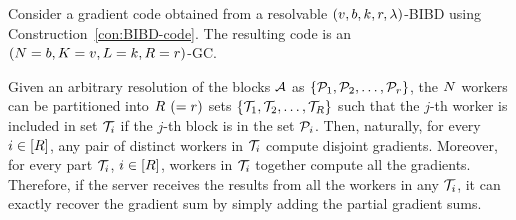 \documentclass[conference,letterpaper]{IEEEtran}
\begin{document}
Consider a gradient code obtained from a resolvable $(v,b,k,r,\lambda)$-BIBD using Construction~\ref{con:BIBD-code}.
The resulting code is an $(N = b, K = v, L = k, R = r)$-GC. 
\begin{remark}
\label{rem:r-BIBD-disjoint}
Given an arbitrary resolution of the blocks $\mathcal{A}$ as $\{\mathcal{P}_1,\mathcal{P}_2,\ldots,\mathcal{P}_{r}\}$, the $N$ workers can be partitioned into $R$ $(= r)$ sets $\{\mathcal{T}_1,\mathcal{T}_2,\ldots,\mathcal{T}_{R}\}$ such that the $j$-th worker is included in set $\mathcal{T}_i$ if the $j$-th block is in the set $\mathcal{P}_i$. Then, naturally, for every $i\in[R]$, any pair of distinct workers in $\mathcal{T}_i$ compute disjoint gradients. Moreover, for every part $\mathcal{T}_i$, $i\in[R]$, workers in $\mathcal{T}_i$ together compute all the gradients. Therefore, if the server receives the results from all the workers in any $\mathcal{T}_i$, it can exactly recover the gradient sum by simply adding the partial gradient sums.
\end{remark}


\end{document}
